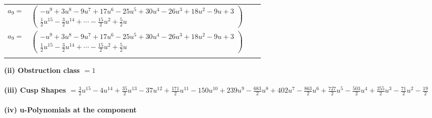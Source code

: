 \documentclass[1p]{elsarticle_modified}
\theoremstyle{definition}
\begin{document}
\begin{tabular}{m{7pt} m{180pt} m{7pt} m{180pt} }
\flushright $a_{9}=$&$\begin{pmatrix}- u^9+3 u^8-9 u^7+17 u^6-25 u^5+30 u^4-26 u^3+18 u^2-9 u+3\\\frac{1}{2} u^{15}-\frac{3}{2} u^{14}+\cdots-\frac{15}{2} u^2+\frac{5}{2} u\end{pmatrix}$\\ \flushright $a_{9}=$&$\begin{pmatrix}- u^9+3 u^8-9 u^7+17 u^6-25 u^5+30 u^4-26 u^3+18 u^2-9 u+3\\\frac{1}{2} u^{15}-\frac{3}{2} u^{14}+\cdots-\frac{15}{2} u^2+\frac{5}{2} u\end{pmatrix}$\\&\end{tabular}
\flushleft \textbf{(ii) Obstruction class $= 1$}\\~\\
\flushleft \textbf{(iii) Cusp Shapes $= \frac{3}{2} u^{15}-4 u^{14}+\frac{35}{2} u^{13}-37 u^{12}+\frac{171}{2} u^{11}-150 u^{10}+239 u^9-\frac{683}{2} u^8+402 u^7-\frac{863}{2} u^6+\frac{727}{2} u^5-\frac{503}{2} u^4+\frac{255}{2} u^3-\frac{71}{2} u^2-\frac{19}{2}$}\\~\\
\newpage\renewcommand{\arraystretch}{1}
\flushleft \textbf{(iv) u-Polynomials at the component}\newline \\
\end{document}

